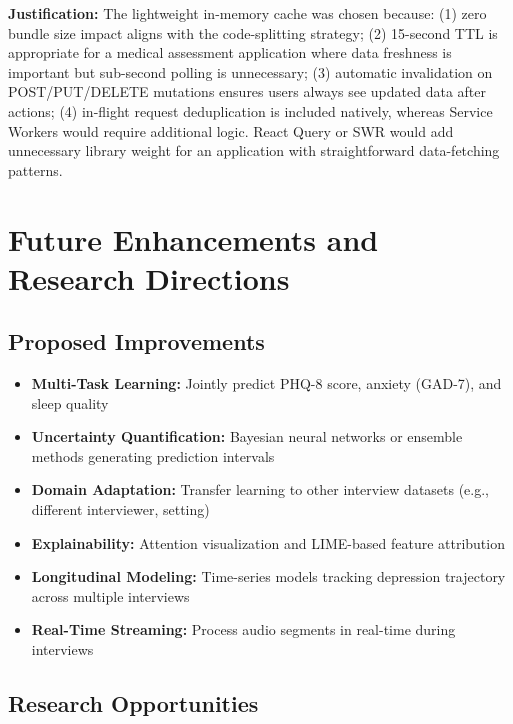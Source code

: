 \documentclass[12pt]{article}
\begin{document}
	\textbf{Justification:} The lightweight in-memory cache was chosen because: (1) zero bundle size impact aligns with the code-splitting strategy; (2) 15-second TTL is appropriate for a medical assessment application where data freshness is important but sub-second polling is unnecessary; (3) automatic invalidation on POST/PUT/DELETE mutations ensures users always see updated data after actions; (4) in-flight request deduplication is included natively, whereas Service Workers would require additional logic. React Query or SWR would add unnecessary library weight for an application with straightforward data-fetching patterns.


	\section{Future Enhancements and Research Directions}

	\subsection{Proposed Improvements}

	\begin{itemize}
		\item \textbf{Multi-Task Learning:} Jointly predict PHQ-8 score, anxiety (GAD-7), and sleep quality
		\item \textbf{Uncertainty Quantification:} Bayesian neural networks or ensemble methods generating prediction intervals
		\item \textbf{Domain Adaptation:} Transfer learning to other interview datasets (e.g., different interviewer, setting)
		\item \textbf{Explainability:} Attention visualization and LIME-based feature attribution
		\item \textbf{Longitudinal Modeling:} Time-series models tracking depression trajectory across multiple interviews
		\item \textbf{Real-Time Streaming:} Process audio segments in real-time during interviews
	\end{itemize}

	\subsection{Research Opportunities}
\end{document}
